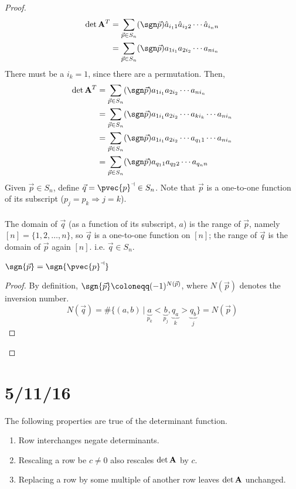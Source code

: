 \documentclass[12pt]{article}
\begin{document}
\begin{proof}
\[
\begin{aligned}
  \det{{\bf A}^T} &= \sum_{\vec{p} \in S_n}(\sgn \vec{p})\hat{a}_{i_11}\hat{a}_{i_22}\cdots \hat{a}_{i_nn} \\
  &= \sum_{\vec{p} \in S_n}(\sgn \vec{p})a_{1i_1}a_{2i_2}\cdots a_{ni_n}
\end{aligned}
\]
There must be a $i_k = 1$, since there are a permutation. Then,
\[
\begin{aligned}
  \det{{\bf A}^T} &= \sum_{\vec{p} \in S_n}(\sgn \vec{p})a_{1i_1}a_{2i_2}\cdots a_{ni_n} \\
  &= \sum_{\vec{p} \in S_n}(\sgn \vec{p})a_{1i_1}a_{2i_2}\cdots a_{ki_k}\cdots a_{ni_n} \\
  &= \sum_{\vec{p} \in S_n}(\sgn \vec{p})a_{1i_1}a_{2i_2}\cdots a_{q_11}\cdots a_{ni_n} \\
  &= \sum_{\vec{p} \in S_n}(\sgn \vec{p})a_{q_11}a_{q_22}\cdots a_{q_nn}
\end{aligned}
\]
Given $\vec{p} \in S_n$, define $\vec{q} = \pvec{p}^{\dashv} \in S_n$. Note that $\vec{p}$ is a one-to-one function of its subscript ($p_j = p_k \Rightarrow j = k$). \\ \\
The domain of $\vec{q}$ (as a function of its subscript, $a$) is the range of $\vec{p}$, namely $[n] = \{1,2,\dots,n\}$, so $\vec{q}$ is a one-to-one function on $[n]$; the range of $\vec{q}$ is the domain of $\vec{p}$ again $[n]$. i.e. $\vec{q} \in S_n$.

\begin{lemma}
$\sgn{\vec{p}} = \sgn{\pvec{p}^{\dashv}}$
\end{lemma}
\begin{proof}
By definition, $\sgn{\vec{p}} \coloneqq (-1)^{N(\vec{p})}$, where $N(\vec{p})$ denotes the inversion number. \[ N(\vec{q}) = \#\{ (a,b) \ | \ \underbrace{a}_{p_k}<\underbrace{b}_{p_j}, \underbrace{q_a}_k > \underbrace{q_b}_j \} = N(\vec{p})\]
\end{proof}


\end{proof}

\section{5/11/16}
\begin{theorem}
The following properties are true of the determinant function.
\begin{enumerate}
\item Row interchanges negate determinants.
\item Rescaling a row be $c \neq 0$ also rescales $\det{\bf A}$ by $c$.
\item Replacing a row by some multiple of another row leaves $\det{\bf A}$ unchanged.
\end{enumerate}
\end{theorem}
\end{document}
